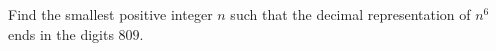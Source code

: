 Find the smallest positive integer $n$ such that the decimal representation of $n^6$ ends in the digits $809$.
